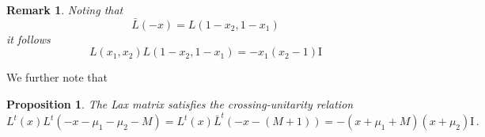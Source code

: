 \documentclass[11pt]{article}
\numberwithin{equation}{section}
\newtheorem{proposition}[theorem]{Proposition}
\newtheorem{remark}[theorem]{Remark}
\newcommand{\ID}{\mathrm{I}}
\begin{document}
\begin{remark}
   Noting that
    \begin{equation}
        \bar L(-x)=L(1-x_2,1-x_1)
    \end{equation}
    it follows 
    \begin{equation}
    \label{L-symmetry-eq}
		L(x_1,x_2)L(1-x_2,1-x_1)=-x_1(x_2-1)\ID
	\end{equation}
\end{remark}
We further note that
\begin{proposition}\label{crossL}
The Lax matrix satisfies the crossing-unitarity relation
\begin{equation}
 L^t(x)L^t(-x-\mu_1-\mu_2-M)=L^t(x)\bar L^t(-x-(M+1))=-(x+\mu_1+M)(x+\mu_2)\ID\,.
\end{equation}
\end{proposition}
\end{document}
